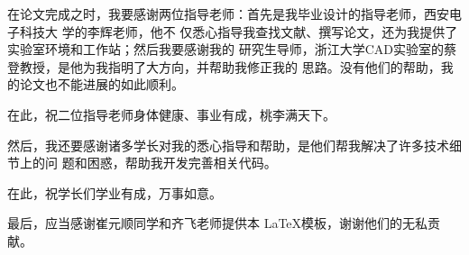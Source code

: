 \begin{thanksfor}
在论文完成之时，我要感谢两位指导老师：首先是我毕业设计的指导老师，西安电子科技大
学的李辉老师，他不
仅悉心指导我查找文献、撰写论文，还为我提供了实验室环境和工作站；然后我要感谢我的
研究生导师，浙江大学CAD实验室的蔡登教授，是他为我指明了大方向，并帮助我修正我的
思路。没有他们的帮助，我的论文也不能进展的如此顺利。

在此，祝二位指导老师身体健康、事业有成，桃李满天下。

然后，我还要感谢诸多学长对我的悉心指导和帮助，是他们帮我解决了许多技术细节上的问
题和困惑，帮助我开发完善相关代码。

在此，祝学长们学业有成，万事如意。

最后，应当感谢崔元顺同学和齐飞老师提供本 \LaTeX 模板，谢谢他们的无私贡献。
\end{thanksfor}